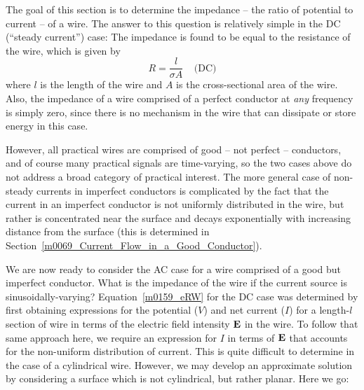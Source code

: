 

\label{m0159_Impedance_of_a_Wire} %

The goal of this section is to determine the impedance -- the ratio of potential to current -- of a wire.
The answer to this question is relatively simple in the DC (``steady current'') case:
The impedance is found to be equal to the resistance of the wire, which is given by
%
\begin{equation}
R = \frac{l}{\sigma A} ~~~~~\mbox{(DC)}
\label{m0159_eRW}    
\end{equation}
where $l$ is the length of the wire and $A$ is the cross-sectional area of the wire.
Also, the impedance of a wire comprised of a perfect conductor
at \emph{any} frequency is simply zero, since there is no mechanism in the wire that can dissipate or store energy in this case.

However, all practical wires are comprised of good -- not perfect -- conductors, 
and of course many practical signals are time-varying, so the two cases above do not address a broad category of practical interest. 
The more general case of non-steady currents in imperfect conductors is complicated by the fact that the current in an imperfect conductor is not uniformly distributed in the wire, but rather is concentrated near the surface and decays exponentially with increasing distance from the surface (this is determined in Section~\ref{m0069_Current_Flow_in_a_Good_Conductor}).

We are now ready to consider the AC case for a wire comprised of a good but imperfect conductor.  
What is the impedance of the wire if the current source is sinusoidally-varying?
Equation~\ref{m0159_eRW} for the DC case was determined by first obtaining expressions for the potential ($V$) and net current ($I$) for a length-$l$ section of wire in terms of the electric field intensity ${\bf E}$ in the wire.  To follow that same approach here, we require an expression for $I$ in terms of ${\bf E}$ that accounts for the non-uniform distribution of current.
This is quite difficult to determine in the case of a cylindrical wire.
However, we may develop an approximate solution by considering a surface which is not cylindrical, but rather planar.  Here we go:

